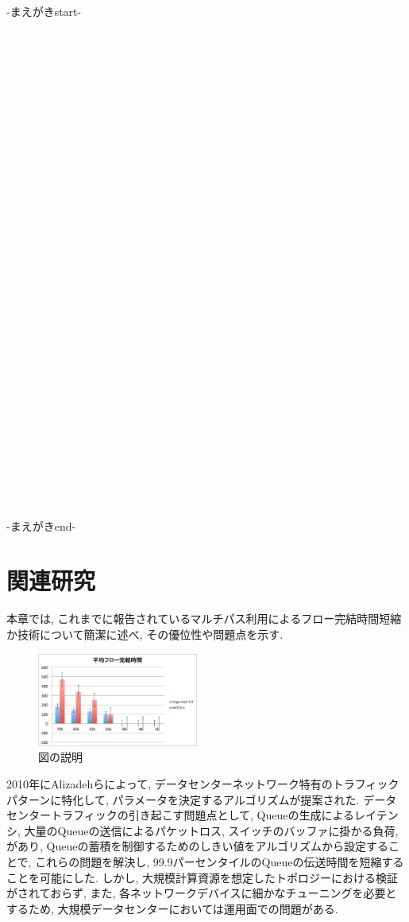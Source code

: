 \documentclass{ieicej}
\begin{document}
-まえがきstart-\\
\\
\\
\\
\\
\\
\\
\\
\\
\\
\\
\\
\\
\\
\\
\\
\\
\\
\\
\\
\\
\\
\\
\\
\\
\\
\\
\\
\\
\\
\\
\\
\\
-まえがきend-

\section{関連研究}
本章では, これまでに報告されているマルチパス利用によるフロー完結時間短縮か技術について簡潔に述べ, その優位性や問題点を示す.
\begin{figure}[h]
    \begin{center}
    \includegraphics[width=150pt, bb=20 20 592 504]{./img/test.pdf}
    \caption{図の説明}
    \label{fig:one}
    \end{center}
\end{figure}

2010年にAlizadehらによって, データセンターネットワーク特有のトラフィックパターンに特化して, パラメータを決定するアルゴリズムが提案された.
データセンタートラフィックの引き起こす問題点として, Queueの生成によるレイテンシ, 大量のQueueの送信によるパケットロス,
スイッチのバッファに掛かる負荷, があり, Queueの蓄積を制御するためのしきい値をアルゴリズムから設定することで, これらの問題を解決し,
99.9パーセンタイルのQueueの伝送時間を短縮することを可能にした.
しかし, 大規模計算資源を想定したトポロジーにおける検証がされておらず, また, 各ネットワークデバイスに細かなチューニングを必要とするため,
大規模データセンターにおいては運用面での問題がある.
\end{document}
